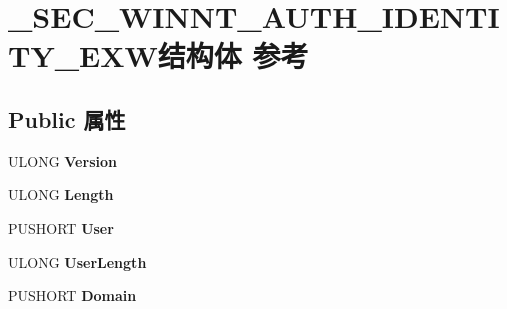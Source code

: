 \hypertarget{struct___s_e_c___w_i_n_n_t___a_u_t_h___i_d_e_n_t_i_t_y___e_x_w}{}\section{\+\_\+\+S\+E\+C\+\_\+\+W\+I\+N\+N\+T\+\_\+\+A\+U\+T\+H\+\_\+\+I\+D\+E\+N\+T\+I\+T\+Y\+\_\+\+E\+X\+W结构体 参考}
\label{struct___s_e_c___w_i_n_n_t___a_u_t_h___i_d_e_n_t_i_t_y___e_x_w}
\subsection*{Public 属性}
\begin{DoxyCompactItemize}
\item 
\mbox{\label{struct___s_e_c___w_i_n_n_t___a_u_t_h___i_d_e_n_t_i_t_y___e_x_w_ad3af69511817e16f9d084db46172a8b2}} 
U\+L\+O\+NG {\bfseries Version}
\item 
\mbox{\label{struct___s_e_c___w_i_n_n_t___a_u_t_h___i_d_e_n_t_i_t_y___e_x_w_a43a240794b7a10854154e9a370fd4d45}} 
U\+L\+O\+NG {\bfseries Length}
\item 
\mbox{\label{struct___s_e_c___w_i_n_n_t___a_u_t_h___i_d_e_n_t_i_t_y___e_x_w_a016d6435977b410eeb752a67dcaa4e99}} 
P\+U\+S\+H\+O\+RT {\bfseries User}
\item 
\mbox{\label{struct___s_e_c___w_i_n_n_t___a_u_t_h___i_d_e_n_t_i_t_y___e_x_w_a2ad4194eb6b61225b20f9f7bfe6895cd}} 
U\+L\+O\+NG {\bfseries User\+Length}
\item 
\mbox{\label{struct___s_e_c___w_i_n_n_t___a_u_t_h___i_d_e_n_t_i_t_y___e_x_w_a0c6dec2ae740d8876a5b57f3deff6274}} 
P\+U\+S\+H\+O\+RT {\bfseries Domain}
\item 
\mbox{\label{struct___s_e_c___w_i_n_n_t___a_u_t_h___i_d_e_n_t_i_t_y___e_x_w_ae32c81ac839aa0637aa70ae808259894}} 

\end{DoxyCompactItemize}
